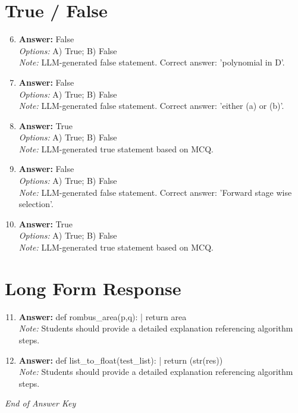 \documentclass[12pt]{article}
\begin{document}
\section*{True / False}
\begin{enumerate}[label=\arabic*.]
\setcounter{enumi}{5}
\item \textbf{Answer:} False
\\ \textit{Options:} A) True; B) False
\\ \textit{Note:} LLM-generated false statement. Correct answer: 'polynomial in D'.
\item \textbf{Answer:} False
\\ \textit{Options:} A) True; B) False
\\ \textit{Note:} LLM-generated false statement. Correct answer: 'either (a) or (b)'.
\item \textbf{Answer:} True
\\ \textit{Options:} A) True; B) False
\\ \textit{Note:} LLM-generated true statement based on MCQ.
\item \textbf{Answer:} False
\\ \textit{Options:} A) True; B) False
\\ \textit{Note:} LLM-generated false statement. Correct answer: 'Forward stage wise selection'.
\item \textbf{Answer:} True
\\ \textit{Options:} A) True; B) False
\\ \textit{Note:} LLM-generated true statement based on MCQ.
\end{enumerate}

\section*{Long Form Response}
\begin{enumerate}[label=\arabic*.]
\setcounter{enumi}{10}
\item \textbf{Answer:} def rombus\_area(p,q): | return area
\\ \textit{Note:} Students should provide a detailed explanation referencing algorithm steps.
\item \textbf{Answer:} def list\_to\_float(test\_list): | return (str(res))
\\ \textit{Note:} Students should provide a detailed explanation referencing algorithm steps.
\end{enumerate}

\vfill
\noindent\textit{End of Answer Key}
\end{document}
